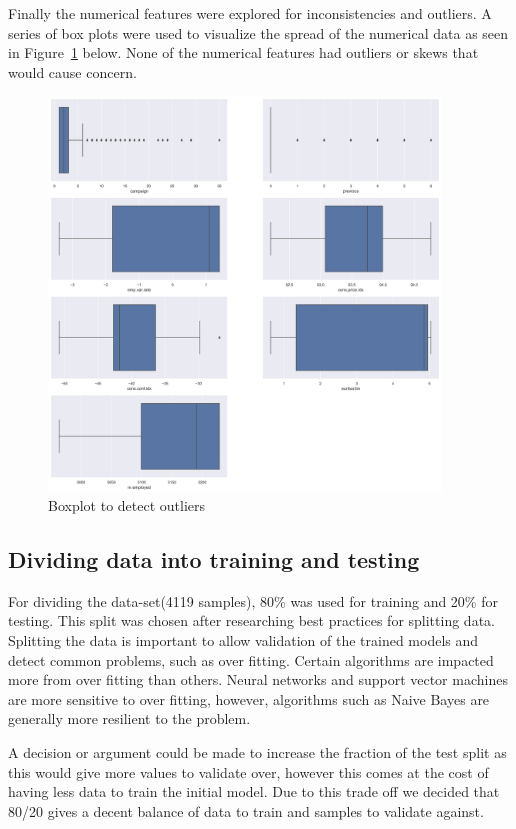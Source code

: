 Finally the numerical features were explored for inconsistencies and outliers. A series of box plots were used to visualize the spread of the numerical data as seen in Figure~\ref{fig:fig1} below. None of the numerical features had outliers or skews that would cause concern.
\begin{figure}[h!]
  \centering
  \includegraphics[width=4.1in]{assignment2/1-1-boxplots.png}
  \caption{Boxplot to detect outliers}
  \label{fig:fig1}
\end{figure}

\newpage
\subsection{Dividing data into training and testing}
For dividing the data-set(4119 samples), 80\% was used for training and 20\% for testing. This split was chosen after researching best practices for splitting data\cite{ref_article1}. Splitting the data is important to allow validation of the trained models and detect common problems, such as over fitting. Certain algorithms are impacted more from over fitting than others. Neural networks and support vector machines are more sensitive to over fitting, however, algorithms such as Naive Bayes are generally more resilient to the problem.

A decision or argument could be made to increase the fraction of the test split as this would give more values to validate over, however this comes at the cost of having less data to train the initial model. Due to this trade off we decided that 80/20 gives a decent balance of data to train and samples to validate against.


